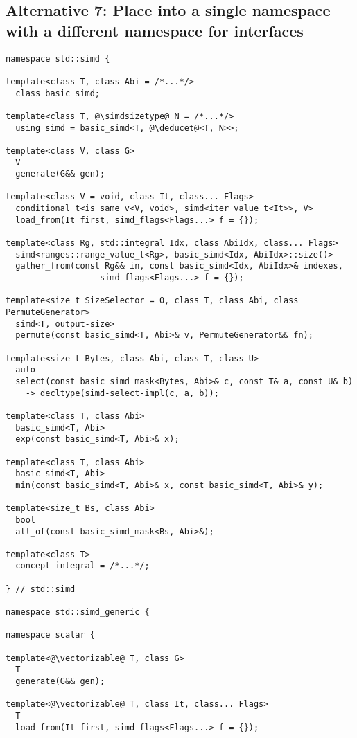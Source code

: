 \subsection{Alternative 7: Place  into a single namespace with a different namespace for \simdgeneric interfaces}
\label{sec:alt7}

\medskip\begin{lstlisting}[style=Vc]
namespace std::simd {

template<class T, class Abi = /*...*/>
  class basic_simd;

template<class T, @\simdsizetype@ N = /*...*/>
  using simd = basic_simd<T, @\deducet@<T, N>>;

template<class V, class G>
  V
  generate(G&& gen);

template<class V = void, class It, class... Flags>
  conditional_t<is_same_v<V, void>, simd<iter_value_t<It>>, V>
  load_from(It first, simd_flags<Flags...> f = {});

template<class Rg, std::integral Idx, class AbiIdx, class... Flags>
  simd<ranges::range_value_t<Rg>, basic_simd<Idx, AbiIdx>::size()>
  gather_from(const Rg&& in, const basic_simd<Idx, AbiIdx>& indexes,
                   simd_flags<Flags...> f = {});

template<size_t SizeSelector = 0, class T, class Abi, class PermuteGenerator>
  simd<T, output-size>
  permute(const basic_simd<T, Abi>& v, PermuteGenerator&& fn);

template<size_t Bytes, class Abi, class T, class U>
  auto
  select(const basic_simd_mask<Bytes, Abi>& c, const T& a, const U& b)
    -> decltype(simd-select-impl(c, a, b));

template<class T, class Abi>
  basic_simd<T, Abi>
  exp(const basic_simd<T, Abi>& x);

template<class T, class Abi>
  basic_simd<T, Abi>
  min(const basic_simd<T, Abi>& x, const basic_simd<T, Abi>& y);

template<size_t Bs, class Abi>
  bool
  all_of(const basic_simd_mask<Bs, Abi>&);

template<class T>
  concept integral = /*...*/;

} // std::simd

namespace std::simd_generic {

namespace scalar {

template<@\vectorizable@ T, class G>
  T
  generate(G&& gen);

template<@\vectorizable@ T, class It, class... Flags>
  T
  load_from(It first, simd_flags<Flags...> f = {});


\end{lstlisting}
